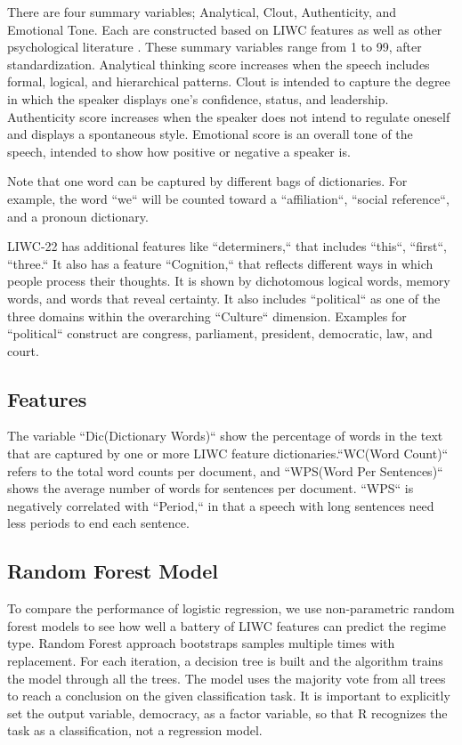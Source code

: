 \documentclass[12pt]{article}
\begin{document}
There are four summary variables; Analytical, Clout, Authenticity, and Emotional Tone. Each are constructed based on LIWC features as well as other psychological literature \parencite{boyd_did_2015, cohn_linguistic_2004, kacewicz_pronoun_2014, newman_lying_2003}. These summary variables range from 1 to 99, after standardization. Analytical thinking score increases when the speech includes formal, logical, and hierarchical patterns. Clout is intended to capture the degree in which the speaker displays one's confidence, status, and leadership. Authenticity score increases when the speaker does not intend to regulate oneself and displays a spontaneous style. Emotional score is an overall tone of the speech, intended to show how positive or negative a speaker is.

Note that one word can be captured by different bags of dictionaries. For example, the word ``we`` will be counted toward a ``affiliation``, ``social reference``, and a pronoun dictionary.

LIWC-22 has additional features like ``determiners,`` that includes ``this``, ``first``, ``three.`` It also has a feature ``Cognition,`` that reflects different ways in which people process their thoughts. It is shown by dichotomous logical words, memory words, and words that reveal certainty. It also includes ``political`` as one of the three domains within the overarching ``Culture`` dimension. Examples for ``political`` construct are congress, parliament, president, democratic, law, and court.

\subsection{Features}
The variable ``Dic(Dictionary Words)`` show the percentage of words in the text that are captured by one or more LIWC feature dictionaries.``WC(Word Count)`` refers to the total word counts per document, and ``WPS(Word Per Sentences)`` shows the average number of words for sentences per document. ``WPS`` is negatively correlated with ``Period,`` in that a speech with long sentences need less periods to end each sentence.

\subsection{Random Forest Model}
To compare the performance of logistic regression, we use non-parametric random forest models to see how well a battery of LIWC features can predict the regime type.
Random Forest approach bootstraps samples multiple times with replacement. For each iteration, a decision tree is built and the algorithm trains the model through all the trees. The model uses the majority vote from all trees to reach a conclusion on the given classification task. It is important to explicitly set the output variable, democracy, as a factor variable, so that R recognizes the task as a classification, not a regression model.
\end{document}
